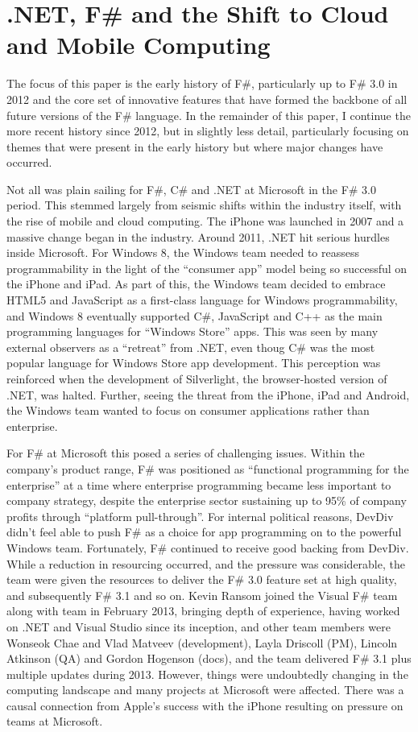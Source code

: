 \documentclass[acmsmall]{acmart}\settopmatter{}
\begin{document}
\section*{.NET, F\# and the Shift to Cloud and Mobile Computing}

The focus of this paper is the early history of F\#, particularly up to F\# 3.0 in 2012 and the core set of innovative
features that have formed the backbone of all future versions of the F\# language. In the remainder of this paper, I
continue the more recent history since 2012, but in slightly less detail, particularly focusing on themes that were
present in the early history but where major changes have occurred.

Not all was plain sailing for F\#, C\# and .NET at Microsoft in the F\# 3.0 period.  This stemmed largely from seismic
shifts within the industry itself, with the rise of mobile and cloud computing.  The iPhone was launched in 2007 and a
massive change began in the industry. Around 2011, .NET hit serious hurdles inside Microsoft. For Windows 8, the
Windows team needed to reassess programmability in the light of the “consumer app” model being so successful on the
iPhone and iPad. As part of this, the Windows team decided to embrace HTML5 and JavaScript as a first-class language
for Windows programmability, and Windows 8 eventually supported C\#, JavaScript and C++ as the main programming
languages for “Windows Store” apps.  This was seen by many external observers as a “retreat” from .NET, even thoug
 C\# was the most popular language for Windows Store app development. This perception was reinforced when the
development of Silverlight, the browser-hosted version of .NET, was halted. Further, seeing the threat from the iPhone,
iPad and Android, the Windows team wanted to focus on consumer applications rather than enterprise.  

For F\# at Microsoft this posed a series of challenging issues. Within the company’s product range, F\# was positioned
as “functional programming for the enterprise” at a time where enterprise programming became less important to company
strategy, despite the enterprise sector sustaining up to 95\% of company profits through “platform pull-through”. For internal
political reasons, DevDiv didn’t feel able to push F\# as a choice for app programming on to the powerful Windows team.
Fortunately, F\# continued to receive good backing from DevDiv. While a reduction in resourcing occurred, and the pressure
was considerable, the team were given the resources to deliver the F\# 3.0 feature set at high quality, and
subsequently F\# 3.1 and so on.  Kevin Ransom joined the Visual F\# team along with team in February 2013, bringing depth of experience, having
worked on .NET and Visual Studio since its inception, and other team members were Wonseok Chae and Vlad Matveev (development), Layla Driscoll (PM),
Lincoln Atkinson (QA) and Gordon Hogenson (docs), and the team delivered F\# 3.1 plus multiple updates during 2013.
However, things were undoubtedly changing in the computing landscape and many
projects at Microsoft were affected. There was a causal connection from Apple's success with the iPhone resulting on pressure
on teams at Microsoft.  
\end{document}

